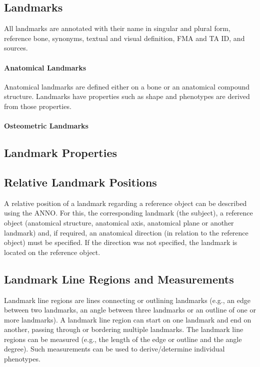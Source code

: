 \documentclass[sw]{iosart2x}
\begin{document}
\subsection{Landmarks}\label{sec:landmark}
All landmarks are annotated with their name in singular and plural form, reference bone, synonyms, textual and visual definition, FMA and TA ID, and sources.


\paragraph{Anatomical Landmarks}
Anatomical landmarks are defined either on a bone or an anatomical compound structure.
Landmarks have properties such as shape and phenotypes are derived from those properties.

\paragraph{Osteometric Landmarks}

\subsection{Landmark Properties}

\subsection{Relative Landmark Positions}

A relative position of a landmark regarding a reference object can be described using the ANNO.
For this, the corresponding landmark (the subject), a reference object
(anatomical structure, anatomical axis, anatomical plane or another landmark) and, if required, an anatomical direction
(in relation to the reference object) must be specified. If the direction was not specified, the landmark is located on the reference object.

\subsection{Landmark Line Regions and Measurements}
Landmark line regions are lines connecting or outlining landmarks (e.g., an edge between two landmarks, an angle between three landmarks
or an outline of one or more landmarks). A landmark line region can start on one landmark and end on another,
passing through or bordering multiple landmarks.
The landmark line regions can be measured (e.g., the length of the edge or outline and the angle degree).
Such measurements can be used to derive/determine individual phenotypes.
\end{document}

